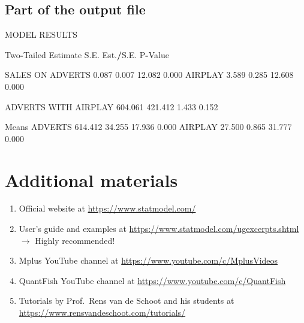 \documentclass[
]{book}
\newenvironment{Shaded}{\begin{snugshade}}{\end{snugshade}}
\newcommand{\FloatTok}[1]{\textcolor[rgb]{0.00,0.00,0.81}{#1}}
\newcommand{\NormalTok}[1]{#1}
\newcommand{\SpecialCharTok}[1]{\textcolor[rgb]{0.81,0.36,0.00}{\textbf{#1}}}
\begin{document}
\subsection{Part of the output file}\label{part-of-the-output-file}

\begin{Shaded}
\begin{Highlighting}[]
\NormalTok{MODEL RESULTS}

\NormalTok{                                                    Two}\SpecialCharTok{{-}}\NormalTok{Tailed}
\NormalTok{                    Estimate       S.E.  Est.}\SpecialCharTok{/}\NormalTok{S.E.    P}\SpecialCharTok{{-}}\NormalTok{Value}

\NormalTok{ SALES    ON}
\NormalTok{    ADVERTS            }\FloatTok{0.087}      \FloatTok{0.007}     \FloatTok{12.082}      \FloatTok{0.000}
\NormalTok{    AIRPLAY            }\FloatTok{3.589}      \FloatTok{0.285}     \FloatTok{12.608}      \FloatTok{0.000}

\NormalTok{ ADVERTS  WITH}
\NormalTok{    AIRPLAY          }\FloatTok{604.061}    \FloatTok{421.412}      \FloatTok{1.433}      \FloatTok{0.152}

\NormalTok{ Means}
\NormalTok{    ADVERTS          }\FloatTok{614.412}     \FloatTok{34.255}     \FloatTok{17.936}      \FloatTok{0.000}
\NormalTok{    AIRPLAY           }\FloatTok{27.500}      \FloatTok{0.865}     \FloatTok{31.777}      \FloatTok{0.000}
\end{Highlighting}
\end{Shaded}

\section{Additional materials}\label{additional-materials}

\begin{enumerate}
\def\labelenumi{\arabic{enumi}.}
\item
  Official website at \url{https://www.statmodel.com/}
\item
  User's guide and examples at \url{https://www.statmodel.com/ugexcerpts.shtml} \(\rightarrow\) Highly recommended!
\item
  Mplus YouTube channel at \url{https://www.youtube.com/c/MplusVideos}
\item
  QuantFish YouTube channel at \url{https://www.youtube.com/c/QuantFish}
\item
  Tutorials by Prof.~Rens van de Schoot and his students at \url{https://www.rensvandeschoot.com/tutorials/}
\end{enumerate}
\end{document}
